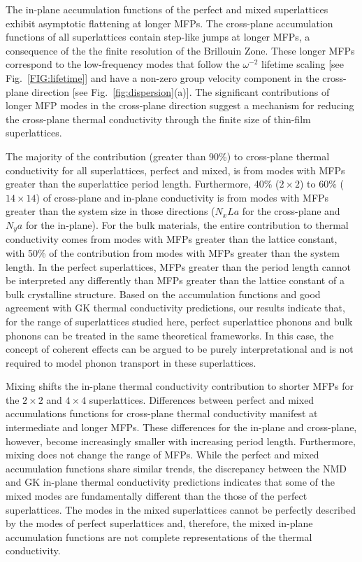 \documentclass[aps,prb,preprint,preprintnumbers,amsmath,amssymb,floatfix,superscriptaddress]{revtex4}
\begin{document}
The in-plane accumulation functions of the perfect and mixed superlattices exhibit asymptotic flattening at longer MFPs. The cross-plane accumulation functions of all superlattices contain step-like jumps at longer MFPs, a consequence of the the finite resolution of the Brillouin Zone.\cite{esfarjani2011heat} These longer MFPs correspond to the low-frequency modes that follow the $\omega^{-2}$ lifetime scaling [see Fig.~\ref{FIG:lifetime}] and have a non-zero group velocity component in the cross-plane direction [see Fig.~\ref{fig:dispersion}(a)]. The significant contributions of longer MFP modes in the cross-plane direction suggest a mechanism for reducing the cross-plane thermal conductivity through the finite size of thin-film superlattices.\cite{Luckyanova16112012} 

The majority of the contribution (greater than 90\%) to cross-plane thermal conductivity for all superlattices, perfect and mixed, is from modes with MFPs greater than the superlattice period length. Furthermore, 40\% ($2 \times 2 $) to 60\% ($14 \times 14$) of cross-plane and in-plane conductivity is from modes with MFPs greater than the system size in those directions ($N_xLa$ for the cross-plane and $N_ya$ for the in-plane). For the bulk materials, the entire contribution to thermal conductivity comes from modes with MFPs greater than the lattice constant, with 50\% of the contribution from modes with MFPs greater than the system length. In the perfect superlattices, MFPs greater than the period length cannot be interpreted any differently than MFPs greater than the lattice constant of a bulk crystalline structure. Based on the accumulation functions and good agreement with GK thermal conductivity predictions, our results indicate that, for the range of superlattices studied here, perfect superlattice phonons and bulk phonons can be treated in the same theoretical frameworks. In this case, the concept of coherent effects can be argued to be purely interpretational and is not required to model phonon transport in these superlattices. 

Mixing shifts the in-plane thermal conductivity contribution to shorter MFPs for the $2 \times 2 $ and $4 \times 4 $ superlattices. Differences between perfect and mixed accumulations functions for cross-plane thermal conductivity manifest at intermediate and longer MFPs. These differences for the in-plane and cross-plane, however, become increasingly smaller with increasing period length. Furthermore, mixing does not change the range of MFPs. While the perfect and mixed accumulation functions share similar trends, the discrepancy between the NMD and GK in-plane thermal conductivity predictions indicates that some of the mixed modes are fundamentally different than the those of the perfect superlattices. The modes in the mixed superlattices cannot be perfectly described by the modes of perfect superlattices and, therefore, the mixed in-plane accumulation functions are not complete representations of the thermal conductivity.
\end{document}
